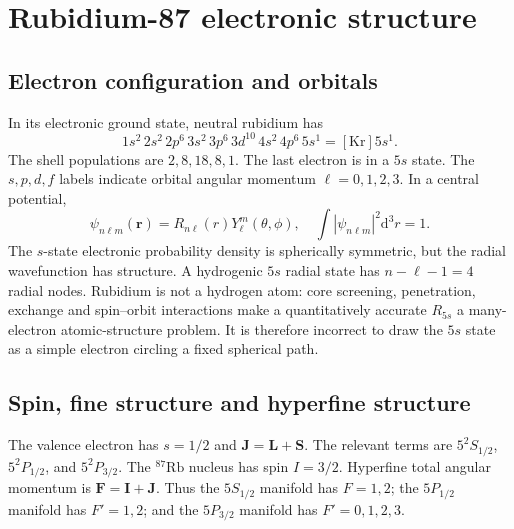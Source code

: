 \documentclass[11pt,a4paper]{article}
\newcommand{\Rb}{^{87}\mathrm{Rb}}
\newcommand{\dd}{\mathrm d}
\begin{document}
\begin{center}
\end{center}

\section{Rubidium-87 electronic structure}
\subsection{Electron configuration and orbitals}
In its electronic ground state, neutral rubidium has
\begin{equation}
1s^2\,2s^2\,2p^6\,3s^2\,3p^6\,3d^{10}\,4s^2\,4p^6\,5s^1=[\mathrm{Kr}]5s^1.
\end{equation}
The shell populations are $2,8,18,8,1$. The last electron is in a $5s$ state. The $s,p,d,f$ labels indicate orbital angular momentum $\ell=0,1,2,3$. In a central potential,
\begin{equation}
\psi_{n\ell m}(\mathbf r)=R_{n\ell}(r)Y_{\ell}^{m}(\theta,\phi),\quad \int |\psi_{n\ell m}|^2\dd^3r=1.
\end{equation}
The $s$-state electronic probability density is spherically symmetric, but the radial wavefunction has structure. A hydrogenic $5s$ radial state has $n-\ell-1=4$ radial nodes. Rubidium is not a hydrogen atom: core screening, penetration, exchange and spin--orbit interactions make a quantitatively accurate $R_{5s}$ a many-electron atomic-structure problem. It is therefore incorrect to draw the $5s$ state as a simple electron circling a fixed spherical path.

\subsection{Spin, fine structure and hyperfine structure}
The valence electron has $s=1/2$ and $\mathbf J=\mathbf L+\mathbf S$. The relevant terms are $5^2S_{1/2}$, $5^2P_{1/2}$, and $5^2P_{3/2}$. The $\Rb$ nucleus has spin $I=3/2$. Hyperfine total angular momentum is $\mathbf F=\mathbf I+\mathbf J$. Thus the $5S_{1/2}$ manifold has $F=1,2$; the $5P_{1/2}$ manifold has $F'=1,2$; and the $5P_{3/2}$ manifold has $F'=0,1,2,3$.
\end{document}
